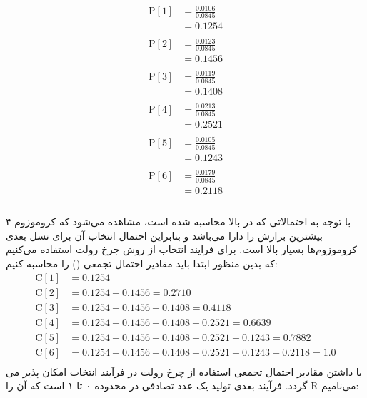 \documentclass[11pt]{article}
\begin{document}
 \\
 \[
\begin{align*}
\text{P}[1] &= \frac{0.0106}{0.0845}\\
&=0.1254\\
\\
\text{P}[2] &= \frac{0.0123}{0.0845}\\
&=0.1456\\
\\
\text{P}[3] &=\frac{0.0119}{0.0845}\\
&=0.1408\\
\\
\text{P}[4] &=\frac{0.0213}{0.0845}\\
&=0.2521\\
\\
\text{P}[5] &=\frac{0.0105}{0.0845}\\
&=0.1243\\
\\
\text{P}[6] &= \frac{0.0179}{0.0845}\\
&=0.2118\\
\\
\end{align*}
\]

با توجه به احتمالاتی که در بالا محاسبه شده است، مشاهده می‌شود که کروموزوم ۴ بیشترین برازش را دارا می‌باشد و بنابراین احتمال انتخاب آن برای نسل بعدی کروموزوم‌ها بسیار بالا است. برای فرایند انتخاب از روش جرخ رولت استفاده می‌کنیم که بدین منظور ابتدا باید مقادیر احتمال تجمعی () را محاسبه کنیم: 
\[
\begin{align*} 
\text{C}[1] &= 0.1254 \\ 
\text{C}[2] &= 0.1254 + 0.1456 = 0.2710 \\ 
\text{C}[3] &= 0.1254 + 0.1456 + 0.1408 = 0.4118 \\ 
\text{C}[4] &= 0.1254 + 0.1456 + 0.1408 + 0.2521 = 0.6639 \\ 
\text{C}[5] &= 0.1254 + 0.1456 + 0.1408 + 0.2521 + 0.1243 = 0.7882 \\ 
\text{C}[6] &= 0.1254 + 0.1456 + 0.1408 + 0.2521 + 0.1243 + 0.2118 = 1.0\\ \end{align*}
\]
با داشتن مقادیر احتمال تجمعی استفاده از چرخ رولت در فرآیند انتخاب امکان پذیر می گردد. فرآیند بعدی تولید یک عدد تصادفی در محدوده ۰ تا ۱ است که آن را R  می‌نامیم: 

\\
\end{document}
